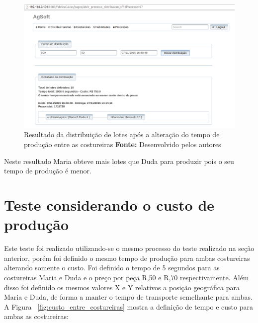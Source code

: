 \begin{figure}[h!]
	\centerline{\includegraphics[scale=0.4]{./imagens/novo_resultado_alterado_tempo_teste1.png}}
	\caption[Resultado da distribuição de lotes após a alteração do tempo de
	produção entre as costureiras]
	{Resultado da distribuição de lotes após a alteração do tempo de
	produção entre as costureiras \textbf{Fonte:} Desenvolvido pelos autores}
	\label{fig:novo_resultado_distribuicao_teste1}
\end{figure}

\par Neste resultado Maria obteve mais lotes que Duda para produzir pois o seu tempo de produção é menor.

\section{Teste considerando o custo de produção}

\par Este teste foi realizado utilizando-se o mesmo processo do teste realizado na seção anterior,
porém foi definido o mesmo tempo de produção para ambas costureiras alterando somente o custo. Foi definido 
o tempo de 5 segundos para as costureiras Maria e Duda e o preço por peça R,50 e R,70 respectivamente. Além disso foi definido os mesmos valores X e Y relativos a posição geográfica para 
Maria e Duda, de forma a manter o tempo de transporte semelhante para ambas. 
A Figura ~\ref{fig:custo_entre_costureiras} mostra a definição de tempo e custo para ambas as costureiras:



